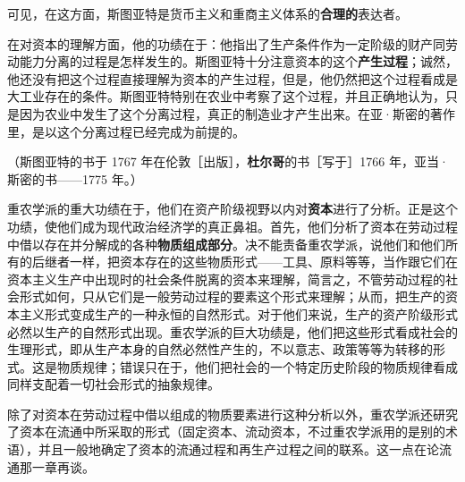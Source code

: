 可见，在这方面，斯图亚特是货币主义和重商主义体系的\textbf{合理的}表达者。

在对资本的理解方面，他的功绩在于：他指出了生产条件作为一定阶级的财产同劳动能力分离的过程是怎样发生的。斯图亚特十分注意资本的这个\textbf{产生过程}；诚然，他还没有把这个过程直接理解为资本的产生过程，但是，他仍然把这个过程看成是大工业存在的条件。斯图亚特特别在农业中考察了这个过程，并且正确地认为，只是因为农业中发生了这个分离过程，真正的制造业才产生出来。在亚·斯密的著作里，是以这个分离过程已经完成为前提的。

（斯图亚特的书于 1767 年在伦敦［出版］，\textbf{杜尔哥}的书［写于］1766 年，亚当·斯密的书——1775 年。）



重农学派的重大功绩在于，他们在资产阶级视野以内对\textbf{资本}进行了分析。正是这个功绩，使他们成为现代政治经济学的真正鼻祖。首先，他们分析了资本在劳动过程中借以存在并分解成的各种\textbf{物质组成部分}。决不能责备重农学派，说他们和他们所有的后继者一样，把资本存在的这些物质形式——工具、原料等等，当作跟它们在资本主义生产中出现时的社会条件脱离的资本来理解，简言之，不管劳动过程的社会形式如何，只从它们是一般劳动过程的要素这个形式来理解；从而，把生产的资本主义形式变成生产的一种永恒的自然形式。对于他们来说，生产的资产阶级形式必然以生产的自然形式出现。重农学派的巨大功绩是，他们把这些形式看成社会的生理形式，即从生产本身的自然必然性产生的，不以意志、政策等等为转移的形式。这是物质规律；错误只在于，他们把社会的一个特定历史阶段的物质规律看成同样支配着一切社会形式的抽象规律。

除了对资本在劳动过程中借以组成的物质要素进行这种分析以外，重农学派还研究了资本在流通中所采取的形式（固定资本、流动资本，不过重农学派用的是别的术语），并且一般地确定了资本的流通过程和再生产过程之间的联系。这一点在论流通那一章再谈。

